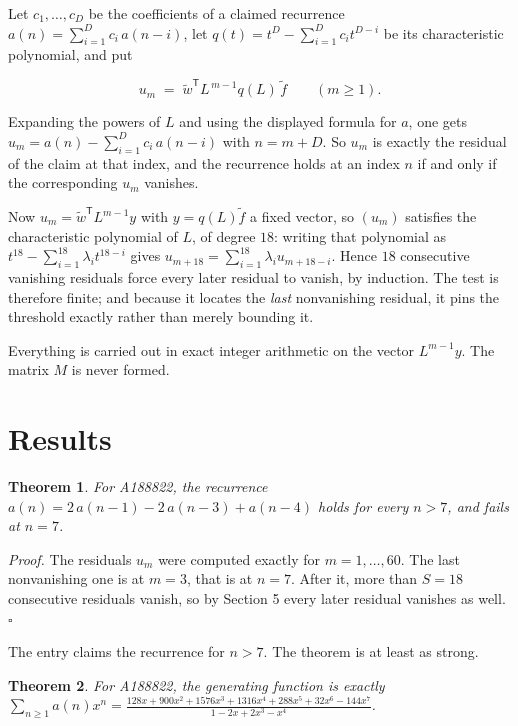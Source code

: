 \documentclass[11pt]{article}
\newtheorem{theorem}{Theorem}
\theoremstyle{definition}
\begin{document}
Let $c_1,\dots,c_D$ be the coefficients of a claimed recurrence $a(n) = \sum_{i=1}^{D} c_i\,a(n-i)$, let $q(t) = t^{D} - \sum_{i=1}^{D} c_i t^{D-i}$ be its characteristic polynomial, and put

\[u_m \;=\; \tilde w^{\mathsf T} L^{\,m-1} q(L)\,\tilde f \qquad (m \ge 1).\]

Expanding the powers of $L$ and using the displayed formula for $a$, one gets $u_m = a(n) - \sum_{i=1}^{D} c_i\,a(n-i)$ with $n = m + D$. So $u_m$ is exactly the residual of the claim at that index, and the recurrence holds at an index $n$ if and only if the corresponding $u_m$ vanishes.

Now $u_m = \tilde w^{\mathsf T} L^{m-1} y$ with $y = q(L)\tilde f$ a fixed vector, so $(u_m)$ satisfies the characteristic polynomial of $L$, of degree $18$: writing that polynomial as $t^{18} - \sum_{i=1}^{18} \lambda_i t^{18-i}$ gives $u_{m+18} = \sum_{i=1}^{18} \lambda_i u_{m+18-i}$. Hence $18$ consecutive vanishing residuals force every later residual to vanish, by induction. The test is therefore finite; and because it locates the {\itshape last} nonvanishing residual, it pins the threshold exactly rather than merely bounding it.

Everything is carried out in exact integer arithmetic on the vector $L^{m-1}y$. The matrix $M$ is never formed.

\section{Results}

\begin{theorem} For A188822, the recurrence $a(n) = 2\,a(n-1) - 2\,a(n-3) + a(n-4)$ holds for every $n > 7$, and fails at $n = 7$.\end{theorem}

{\itshape Proof.} The residuals $u_m$ were computed exactly for $m = 1,\dots,60$. The last nonvanishing one is at $m = 3$, that is at $n = 7$. After it, more than $S = 18$ consecutive residuals vanish, so by Section 5 every later residual vanishes as well. $\square$

The entry claims the recurrence for $n > 7$. The theorem is at least as strong.

\begin{theorem} For A188822, the generating function is exactly $\sum_{n\ge 1} a(n)x^n = \frac{128x + 900x^{2} + 1576x^{3} + 1316x^{4} + 288x^{5} + 32x^{6} - 144x^{7}}{1 - 2x + 2x^{3} - x^{4}}$.\end{theorem}
\end{document}
